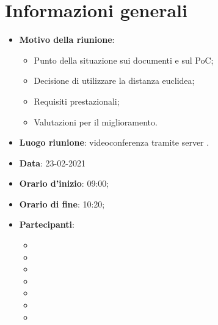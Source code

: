 \section{Informazioni generali}
\begin{itemize}
\item \textbf{Motivo della riunione}: 
\begin{itemize}
\item Punto della situazione sui documenti e sul PoC;
\item Decisione di utilizzare la distanza euclidea;
\item Requisiti prestazionali;
\item Valutazioni per il miglioramento.
\end{itemize}
\item \textbf{Luogo riunione}: videoconferenza tramite server .
\item \textbf{Data}: 23-02-2021
\item \textbf{Orario d'inizio}: 09:00;
\item \textbf{Orario di fine}: 10:20;
\item \textbf{Partecipanti}:
	\begin{itemize}
	\item \BM{}
	\item \SG{}
	\item \SP{}
	\item \SH{}
	\item \PA{}
	\item \ZM{}
	\item \RA{}
	\end{itemize}
\end{itemize}

\newpage
